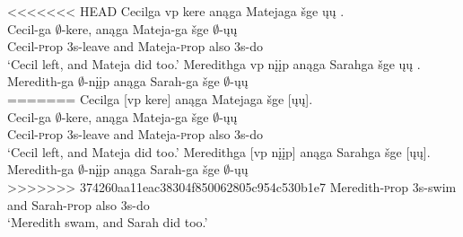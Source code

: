 \documentclass[output=paper]{LSP/langsci}
\begin{document}
\begin{exe}
\ex
\begin{xlist}
\ex
<<<<<<< HEAD
\glll Cecilga {\ob}{vp} kere{\cb} anąga Matejaga šge {\ob}ųų{\cb} .\\
Cecil-ga {} $\emptyset$-kere, anąga Mateja-ga šge $\emptyset$-ųų\\
Cecil-{\textsc prop} {} {\textsc 3s}-leave and Mateja-{\textsc prop} also {\textsc 3s}-do\\
\trans `Cecil left, and Mateja did too.'
\ex
\glll Meredithga {\ob}{vp} nįįp{\cb} anąga Sarahga šge {\ob}ųų{\cb} .\\
Meredith-ga {} $\emptyset$-nįįp anąga Sarah-ga šge $\emptyset$-ųų\\
=======
\glll Cecilga {\textsc [vp} kere{\textsc ]} an\k{a}ga Matejaga \v{s}ge {\textsc [}\k{u}\k{u}{\textsc ]}.\\
Cecil-ga {} $\emptyset$-kere, an\k{a}ga Mateja-ga \v{s}ge $\emptyset$-\k{u}\k{u}\\
Cecil-{\textsc prop} {} {\textsc 3s}-leave and Mateja-{\textsc prop} also {\textsc 3s}-do\\
\trans `Cecil left, and Mateja did too.'
\ex
\glll Meredithga {\textsc [vp} n\k{i}\k{i}p{\textsc ]} an\k{a}ga Sarahga \v{s}ge {\textsc [}\k{u}\k{u}{\textsc ]}.\\
Meredith-ga {} $\emptyset$-n\k{i}\k{i}p an\k{a}ga Sarah-ga \v{s}ge $\emptyset$-\k{u}\k{u}\\
>>>>>>> 374260aa11eac38304f850062805c954c530b1e7
Meredith-{\textsc prop} {} {\textsc 3s}-swim and Sarah-{\textsc prop} also {\textsc 3s}-do\\
\trans `Meredith swam, and Sarah did too.'
\end{xlist}
\end{exe}
\end{document}
